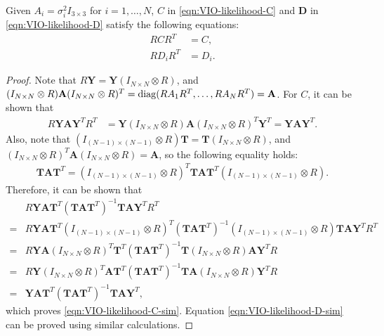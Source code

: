 \begin{lemma} \label{lemma:VIO-likelihood-CD}
	Given $A_i = \sigma_i^2I_{3\times 3}$ for $i=1,\ldots,N$, $C$ in \eqref{eqn:VIO-likelihood-C} and $\mathbf{D}$ in \eqref{eqn:VIO-likelihood-D} satisfy the following equations:
	\begin{align}
		RCR^T &= C, \label{eqn:VIO-likelihood-C-sim} \\
		RD_iR^T &= D_i. \label{eqn:VIO-likelihood-D-sim}
	\end{align}
\end{lemma}
\begin{proof}
	Note that $R\mathbf{Y} = \mathbf{Y}(I_{N\times N}\otimes R)$, and $(I_{N\times N}\otimes R) \mathbf{A} (I_{N\times N}\otimes R)^T = \mathrm{diag}(RA_1R^T,\allowbreak \ldots,\allowbreak RA_NR^T) = \mathbf{A}$.
	For $C$, it can be shown that
	\begin{align*}
		R\mathbf{YAY}^TR^T &= \mathbf{Y} (I_{N\times N}\otimes R) \mathbf{A} (I_{N\times N}\otimes R)^T \mathbf{Y}^T = \mathbf{YAY}^T.
	\end{align*}
	Also, note that $\left(I_{(N-1)\times (N-1)}\otimes R\right) \mathbf{T} = \mathbf{T} (I_{N\times N}\otimes R)$, and $(I_{N\times N}\otimes R)^T \mathbf{A} (I_{N\times N}\otimes R) = \mathbf{A}$, so the following equality holds:
	\begin{align*}
		\mathbf{TAT}^T = \left(I_{(N-1)\times (N-1)}\otimes R\right)^T \mathbf{TAT}^T \left(I_{(N-1)\times (N-1)}\otimes R\right).
	\end{align*}
	Therefore, it can be shown that
	\begin{align*}
		&R\mathbf{Y}\mathbf{A}\mathbf{T}^T (\mathbf{T}\mathbf{A}\mathbf{T}^T)^{-1} \mathbf{T}\mathbf{A}\mathbf{Y}^TR^T \\
		= &R\mathbf{Y} \mathbf{AT}^T \left(I_{(N-1)\times (N-1)}\otimes R\right)^T (\mathbf{TAT}^T)^{-1} \left(I_{(N-1)\times (N-1)}\otimes R\right) \mathbf{TA} \mathbf{Y}^T R^T \\
		= &R\mathbf{YA} (I_{N\times N}\otimes R)^T \mathbf{T}^T (\mathbf{TAT}^T)^{-1} \mathbf{T} (I_{N\times N}\otimes R) \mathbf{AY}^T R \\
		= &R\mathbf{Y} (I_{N\times N}\otimes R)^T \mathbf{AT}^T (\mathbf{TAT}^T)^{-1} \mathbf{TA} (I_{N\times N}\otimes R) \mathbf{Y}^T R \\
		= &\mathbf{Y}\mathbf{A}\mathbf{T}^T (\mathbf{T}\mathbf{A}\mathbf{T}^T)^{-1} \mathbf{T}\mathbf{A}\mathbf{Y}^T,
	\end{align*}
	which proves \eqref{eqn:VIO-likelihood-C-sim}.
	Equation \eqref{eqn:VIO-likelihood-D-sim} can be proved using similar calculations.
\end{proof}

